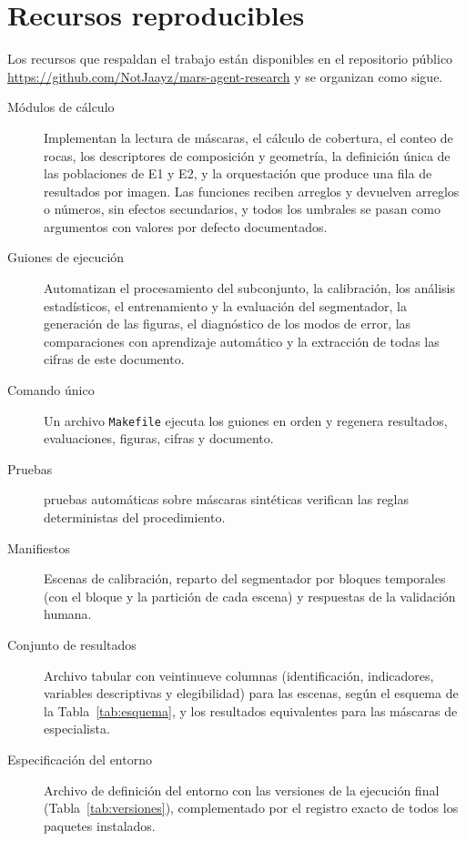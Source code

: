\section{Recursos reproducibles}
\label{app:recursos}

Los recursos que respaldan el trabajo están disponibles en el repositorio público
\url{https://github.com/NotJaayz/mars-agent-research} y se organizan como sigue.

\begin{description}

  \item[Módulos de cálculo] Implementan la lectura de máscaras, el cálculo de cobertura,
    el conteo de rocas, los descriptores de composición y geometría, la definición única de
    las poblaciones de E1 y E2, y la orquestación que produce una fila de resultados por
    imagen. Las funciones reciben arreglos y devuelven arreglos o números, sin efectos
    secundarios, y todos los umbrales se pasan como argumentos con valores por defecto
    documentados.

  \item[Guiones de ejecución] Automatizan el procesamiento del subconjunto, la calibración, los
    análisis estadísticos, el entrenamiento y la evaluación del segmentador, la generación de
    las figuras, el diagnóstico de los modos de error, las comparaciones con aprendizaje
    automático y la extracción de todas las cifras de este documento.

  \item[Comando único] Un archivo \texttt{Makefile} ejecuta los guiones en orden y regenera
    resultados, evaluaciones, figuras, cifras y documento.

  \item[Pruebas] \cPruebasN{} pruebas automáticas sobre máscaras sintéticas verifican las
    reglas deterministas del procedimiento.

  \item[Manifiestos] Escenas de calibración, reparto del segmentador por bloques temporales
(con el bloque y la partición de cada escena) y respuestas de la validación humana.

  \item[Conjunto de resultados] Archivo tabular con veintinueve columnas (identificación, indicadores, variables
    descriptivas y elegibilidad) para las \cNEscenas{} escenas, según el esquema de la
    Tabla~\ref{tab:esquema}, y los resultados equivalentes para las máscaras de especialista.

  \item[Especificación del entorno] Archivo de definición del entorno con las versiones de la
    ejecución final (Tabla~\ref{tab:versiones}), complementado por el registro exacto de todos
    los paquetes instalados.

\end{description}

